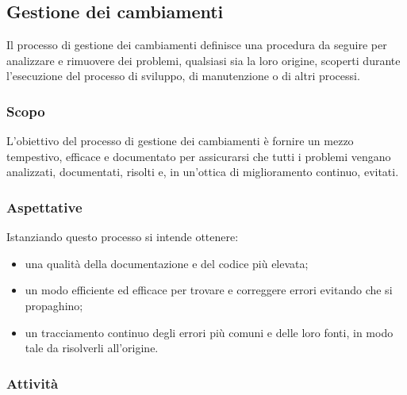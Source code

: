 \subsection{Gestione dei cambiamenti}

	Il processo di gestione dei cambiamenti definisce una procedura da seguire per analizzare e rimuovere dei problemi, qualsiasi sia la loro origine, scoperti durante l'esecuzione del processo di sviluppo, di manutenzione o di altri processi.

	\subsubsection{Scopo}
		L'obiettivo del processo di gestione dei cambiamenti è fornire un mezzo tempestivo, efficace e documentato per assicurarsi che tutti i problemi vengano analizzati, documentati, risolti e, in un'ottica di miglioramento continuo, evitati.

	\subsubsection{Aspettative}
		Istanziando questo processo si intende ottenere:
		\begin{itemize}
		 	\item una qualità della documentazione e del codice più elevata;
		 	\item un modo efficiente ed efficace per trovare e correggere errori evitando che si propaghino;
		 	\item un tracciamento continuo degli errori più comuni e delle loro fonti, in modo tale da risolverli all'origine.
		 \end{itemize}
	\subsubsection{Attività}
